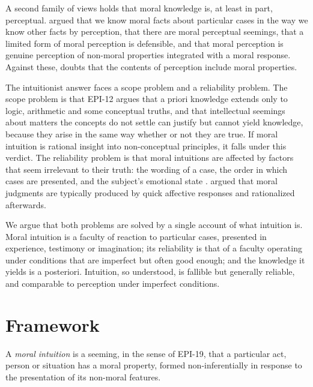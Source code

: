 \documentclass{situationist-preprint}
\begin{document}
A second family of views holds that moral knowledge is, at least in part, perceptual. \citet{McGrath2004} argued that we know moral facts about particular cases in the way we know other facts by perception, \citet{Cullison2010} that there are moral perceptual seemings, \citet{McBrayer2010} that a limited form of moral perception is defensible, and \citet{Audi2013} that moral perception is genuine perception of non-moral properties integrated with a moral response. Against these, \citet{Vayrynen2018} doubts that the contents of perception include moral properties.

The intuitionist answer faces a scope problem and a reliability problem. The scope problem is that EPI-12 argues that a priori knowledge extends only to logic, arithmetic and some conceptual truths, and that intellectual seemings about matters the concepts do not settle can justify but cannot yield knowledge, because they arise in the same way whether or not they are true. If moral intuition is rational insight into non-conceptual principles, it falls under this verdict. The reliability problem is that moral intuitions are affected by factors that seem irrelevant to their truth: the wording of a case, the order in which cases are presented, and the subject's emotional state \citep{Petrinovich1996,SinnottArmstrong2008}. \citet{Haidt2001} argued that moral judgments are typically produced by quick affective responses and rationalized afterwards.

We argue that both problems are solved by a single account of what intuition is. Moral intuition is a faculty of reaction to particular cases, presented in experience, testimony or imagination; its reliability is that of a faculty operating under conditions that are imperfect but often good enough; and the knowledge it yields is a posteriori. Intuition, so understood, is fallible but generally reliable, and comparable to perception under imperfect conditions.

\section{Framework}

\begin{definition}\label{d:intuition}
A \emph{moral intuition} is a seeming, in the sense of EPI-19, that a particular act, person or situation has a moral property, formed non-inferentially in response to the presentation of its non-moral features.
\end{definition}
\end{document}
